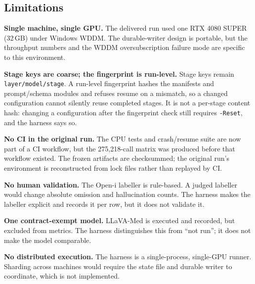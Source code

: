 \subsection{Limitations}

\textbf{Single machine, single GPU.} The delivered run used one RTX 4080 SUPER (32\,GB) under Windows WDDM. The durable-writer design is portable, but the throughput numbers and the WDDM oversubscription failure mode are specific to this environment.

\textbf{Stage keys are coarse; the fingerprint is run-level.} Stage keys remain \texttt{layer/model/stage}. A run-level fingerprint hashes the manifests and prompt/schema modules and refuses resume on a mismatch, so a changed configuration cannot silently reuse completed stages. It is not a per-stage content hash: changing a configuration after the fingerprint check still requires \texttt{-Reset}, and the harness says so.

\textbf{No CI in the original run.} The CPU tests and crash/resume suite are now part of a CI workflow, but the 275,218-call matrix was produced before that workflow existed. The frozen artifacts are checksummed; the original run's environment is reconstructed from lock files rather than replayed by CI.

\textbf{No human validation.} The Open-i labeller is rule-based. A judged labeller would change absolute omission and hallucination counts. The harness makes the labeller explicit and records it per row, but it does not validate it.

\textbf{One contract-exempt model.} LLaVA-Med is executed and recorded, but excluded from metrics. The harness distinguishes this from ``not run''; it does not make the model comparable.

\textbf{No distributed execution.} The harness is a single-process, single-GPU runner. Sharding across machines would require the state file and durable writer to coordinate, which is not implemented.
